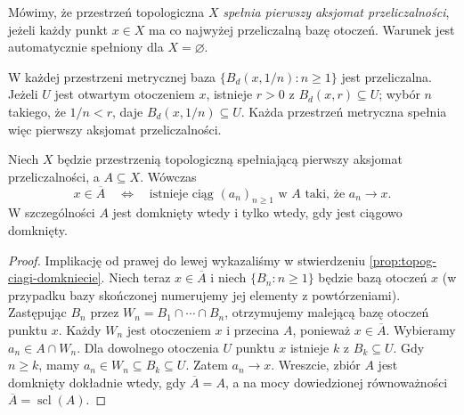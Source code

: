 \begin{definicja}
\label{def:topog-pierwsza-przeliczalnosc}
Mówimy, że przestrzeń topologiczna $X$ \emph{spełnia pierwszy
aksjomat przeliczalności}, jeżeli każdy punkt $x\in X$
ma co najwyżej przeliczalną bazę otoczeń.
Warunek jest automatycznie spełniony dla $X=\varnothing$.
\end{definicja}

\begin{przyklad}
\label{ex:topog-metryczna-pierwsza-przeliczalnosc}
W każdej przestrzeni metrycznej baza
$\{B_d(x,1/n):n\ge1\}$ jest przeliczalna.
Jeżeli $U$ jest otwartym otoczeniem $x$, istnieje $r>0$
z $B_d(x,r)\subseteq U$; wybór $n$ takiego, że $1/n<r$,
daje $B_d(x,1/n)\subseteq U$. Każda przestrzeń metryczna
spełnia więc pierwszy aksjomat przeliczalności.
\end{przyklad}

\begin{twierdzenie}
\label{thm:topog-pierwsza-przeliczalnosc-domkniecie}
Niech $X$ będzie przestrzenią topologiczną spełniającą
pierwszy aksjomat przeliczalności,
a $A\subseteq X$. Wówczas
\[
 x\in\overline A
 \quad\Longleftrightarrow\quad
 \text{istnieje ciąg }(a_n)_{n\ge1}\text{ w }A
 \text{ taki, że }a_n\to x.
\]
W szczególności $A$ jest domknięty wtedy i tylko wtedy,
gdy jest ciągowo domknięty.
\end{twierdzenie}
\begin{proof}
Implikację od prawej do lewej wykazaliśmy w
stwierdzeniu \ref{prop:topog-ciagi-domkniecie}.
Niech teraz $x\in\overline A$ i niech
$\{B_n:n\ge1\}$ będzie bazą otoczeń $x$
(w przypadku bazy skończonej numerujemy jej elementy
z powtórzeniami). Zastępując $B_n$ przez $W_n=B_1\cap\cdots\cap B_n$,
otrzymujemy malejącą bazę otoczeń punktu $x$.
Każdy $W_n$ jest otoczeniem $x$ i przecina $A$,
ponieważ $x\in\overline A$.
Wybieramy $a_n\in A\cap W_n$. Dla dowolnego otoczenia
$U$ punktu $x$ istnieje $k$ z $B_k\subseteq U$.
Gdy $n\ge k$, mamy $a_n\in W_n\subseteq B_k\subseteq U$.
Zatem $a_n\to x$.
Wreszcie, zbiór $A$ jest domknięty dokładnie wtedy,
gdy $\overline A=A$, a na mocy dowiedzionej równoważności
$\overline A=\operatorname{scl}(A)$.
\end{proof}

